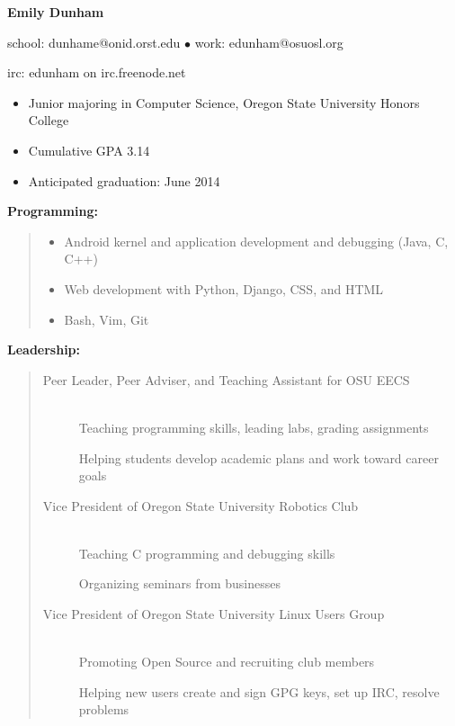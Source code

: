 \documentclass[11pt]{article}
\begin{document}
\centerline{{\LARGE \bf Emily Dunham}}

\smallskip

\centerline{{school: dunhame@onid.orst.edu $\bullet$ work:
edunham@osuosl.org}}
\centerline{{irc: edunham on irc.freenode.net}}

\hrulefill

\bigskip

\begin{itemize}

    \item Junior majoring in Computer Science, Oregon State University 
          Honors College

    \item Cumulative GPA 3.14

    \item Anticipated graduation: June 2014

\end{itemize}

\bigskip
\hrulefill


\smallskip

{\large \bf Programming:}
\begin{quote}
\begin{itemize}
    \item Android kernel and application development and debugging (Java, C, C++)
    \item Web development with Python, Django, CSS, and HTML
    \item Bash, Vim, Git
\end{itemize}
\end{quote}

{\large \bf Leadership:}
\begin{quote}
\begin{description}
    \item[Peer Leader, Peer Adviser, and Teaching Assistant for OSU EECS]
        \hfill \\ 
        Teaching programming skills, leading labs, grading assignments
        
        Helping students develop academic plans and work toward career goals

    \item[Vice President of Oregon State University Robotics Club]
        \hfill \\
        Teaching C programming and debugging skills

        Organizing seminars from businesses

    \item[Vice President of Oregon State University Linux Users Group]
        \hfill \\
        Promoting Open Source and recruiting club members

        Helping new users create and sign GPG keys, set up IRC, resolve problems
\end{description}
\end{quote}
\end{document}
